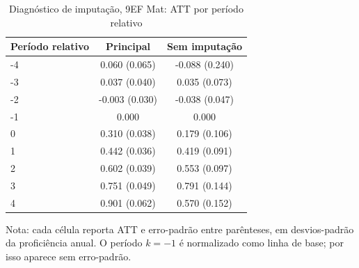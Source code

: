 \begin{table}[!htbp]
\centering
\caption{Diagnóstico de imputação, 9EF Mat: ATT por período relativo}
\label{tab:ap_event_imputacao_9ef_mat}
\vspace{-0.15cm}
\scriptsize
\setlength{\tabcolsep}{4pt}
\renewcommand{\arraystretch}{0.92}
\begin{tabular}{lcc}
\toprule
Período relativo & Principal & Sem imputação \\
\midrule
-4 & 0.060 (0.065) & -0.088 (0.240) \\
-3 & 0.037 (0.040) & 0.035 (0.073) \\
-2 & -0.003 (0.030) & -0.038 (0.047) \\
-1 & 0.000 & 0.000 \\
0 & 0.310 (0.038) & 0.179 (0.106) \\
1 & 0.442 (0.036) & 0.419 (0.091) \\
2 & 0.602 (0.039) & 0.553 (0.097) \\
3 & 0.751 (0.049) & 0.791 (0.144) \\
4 & 0.901 (0.062) & 0.570 (0.152) \\
\bottomrule
\end{tabular}
\begin{flushleft}
\footnotesize Nota: cada célula reporta ATT e erro-padrão entre parênteses, em desvios-padrão da proficiência anual. O período \(k=-1\) é normalizado como linha de base; por isso aparece sem erro-padrão.
\end{flushleft}
\end{table}
